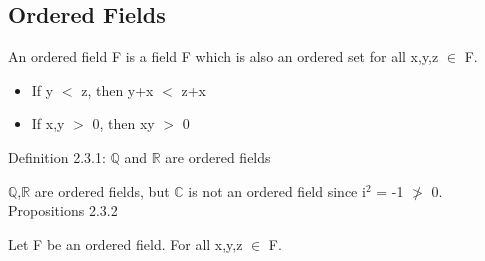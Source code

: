 \subsection{Ordered Fields}

	\hspace{1cm}
	An ordered field F is a field F which is also an ordered set
	for all x,y,z $\in$ F.

	\begin{itemize}[leftmargin=2cm, itemsep=0.1cm]
		\item If y $<$ z, then y+x $<$ z+x
	
		\item If x,y $>$ 0, then xy $>$ 0
	\end{itemize}

\newpage

{ \color{blue} Definition 2.3.1: $\mathbb{Q}$ and $\mathbb{R}$ are ordered fields } 

	\hspace{1cm}
	$ \mathbb{Q} $,$ \mathbb{R} $ are ordered fields,
	but $ \mathbb{C} $ is not an ordered field since i$^2$ = -1 $\not >$ 0. \\

{ \color{blue} Propositions 2.3.2} 

	\hspace{1cm}
	Let F be an ordered field. For all x,y,z $\in$ F.


